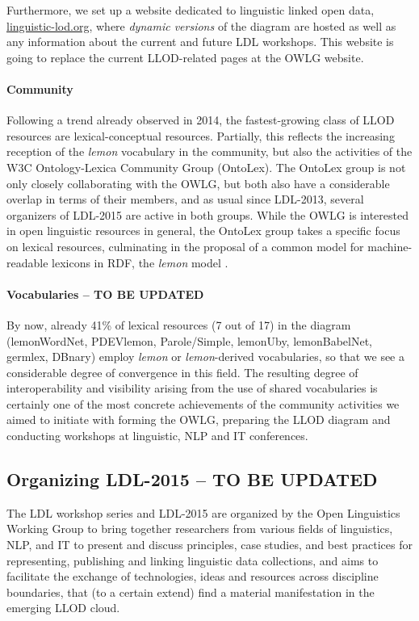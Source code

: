 Furthermore, we set up a website dedicated to linguistic linked open data, \url{linguistic-lod.org}, where \emph{dynamic versions} of the diagram are hosted as well as any information about the current and future LDL workshops. This website is going to replace the current LLOD-related pages at the OWLG website.

\paragraph{Community}
Following a trend already observed in 2014, the fastest-growing class of LLOD resources are lexical-conceptual resources. 
Partially, this reflects the increasing reception of the \emph{lemon} vocabulary in the community, but also the activities of the W3C Ontology-Lexica Community Group (OntoLex). The OntoLex group is not only closely collaborating with the OWLG, but both also have a considerable overlap in terms of their members, and as usual since LDL-2013, several organizers of LDL-2015 are active in both groups.
While the OWLG is interested in open linguistic resources in general, the OntoLex group takes a specific focus on lexical resources, culminating in the proposal of a common model for machine-readable lexicons in RDF, the \emph{lemon} model \cite{mccrae2012integrating}. 

\paragraph{Vocabularies -- TO BE UPDATED}

By now, already 41\% of lexical resources (7 out of 17) in the diagram (lemonWordNet, PDEVlemon, Parole/Simple, lemonUby, lemonBabelNet, germlex, DBnary) employ \emph{lemon} or \emph{lemon}-derived vocabularies, so that we see a considerable degree of convergence in this field. 
The resulting degree of interoperability and visibility arising from the use of shared vocabularies is certainly one of the most concrete achievements of the community activities we aimed to initiate with forming the OWLG, preparing the LLOD diagram and conducting workshops at linguistic, NLP and IT conferences.

\subsection{Organizing LDL-2015 -- TO BE UPDATED}

The LDL workshop series and LDL-2015 are organized by the Open Linguistics Working Group 
to bring together researchers from various fields of linguistics, NLP, and IT to present and discuss principles, case studies, and best practices for representing, publishing and linking linguistic data collections, and aims to facilitate the exchange of technologies, ideas and resources across discipline boundaries, that (to a certain extend) find a material manifestation in the emerging LLOD cloud.

